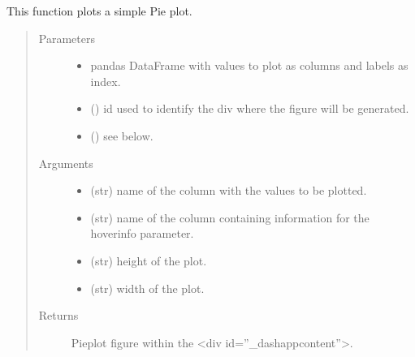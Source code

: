 \documentclass[letterpaper,10pt,english]{sphinxmanual}
\begin{document}

\begin{fulllineitems}
\label{\detokenize{_autosummary/analytics_core.viz:analytics_core.viz.viz.get_pieplot}}
This function plots a simple Pie plot.
\begin{quote}\begin{description}
\item[{Parameters}] \leavevmode\begin{itemize}
\item {} 
 \textendash{} pandas DataFrame with values to plot as columns and labels as index.

\item {} 
 () \textendash{} id used to identify the div where the figure will be generated.

\item {} 
 () \textendash{} see below.

\end{itemize}

\item[{Arguments}] \leavevmode\begin{itemize}
\item {} 
 (str) \textendash{} name of the column with the values to be plotted.

\item {} 
 (str) \textendash{} name of the column containing information for the hoverinfo parameter.

\item {} 
 (str) \textendash{} height of the plot.

\item {} 
 (str) \textendash{} width of the plot.

\end{itemize}

\item[{Returns}] \leavevmode
Pieplot figure within the \textless{}div id=”\_dash\sphinxhyphen{}app\sphinxhyphen{}content”\textgreater{}.

\end{description}\end{quote}

\end{fulllineitems}
\end{document}
